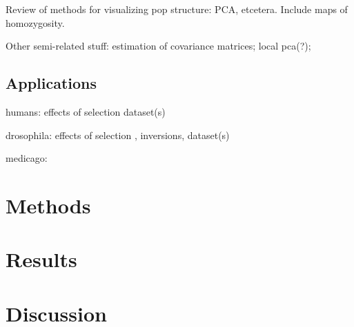 \documentclass{article}
\begin{document}
Review of methods for visualizing pop structure:
PCA, etcetera.
Include maps of homozygosity.

Other semi-related stuff:
estimation of covariance matrices;
local pca(?);

\subsection{Applications}

humans:
effects of selection \citep{sabeti2006positive}
dataset(s)

drosophila:
effects of selection \citep{sella2009pervasive},
inversions,
dataset(s)

medicago:


\section{Methods}


\section{Results}


\section{Discussion}


\end{document}
